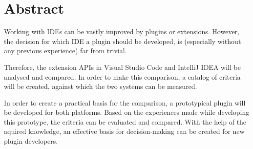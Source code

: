 \chapter{Abstract}


\begin{english} %

Working with IDEs can be vastly improved by plugins
or extensions. However, the decision for which IDE
a plugin should be developed, is (especially without any
previous experience) far from trivial.

Therefore, the extension APIs in Visual Studio Code and 
IntelliJ IDEA will be analysed and compared. In order
to make this comparison, a catalog of criteria will be created,
against which the two systems can be measured.

In order to create a practical basis for the comparison,
a prototypical plugin will be developed for both platforms.
Based on the experiences made while developing this 
prototype, the criteria can be evaluated and compared.
With the help of the aquired knowledge, an effective
basis for decision-making can be created for
new plugin developers.

\end{english}
